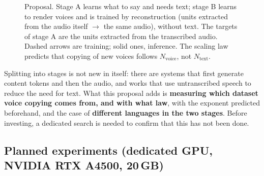\documentclass[a4paper,11pt]{article}
\begin{document}
\begin{figure}[H]
{}
\caption{Proposal. Stage A learns what to say and needs text; stage B learns to render voices and is trained by reconstruction (units extracted from the audio itself $\rightarrow$ the same audio), without text. The targets of stage A are the units extracted from the transcribed audio. Dashed arrows are training; solid ones, inference. The scaling law predicts that copying of new voices follows $N_{\text{voice}}$, not $N_{\text{text}}$.}
\label{fig:proposta}
\end{figure}

Splitting into stages is not new in itself: there are systems that first generate content tokens and then the audio, and works that use untranscribed speech to reduce the need for text. What this proposal adds is \textbf{measuring which dataset voice copying comes from, and with what law}, with the exponent predicted beforehand, and the case of \textbf{different languages in the two stages}. Before investing, a dedicated search is needed to confirm that this has not been done.

\subsection{Planned experiments (dedicated GPU, NVIDIA RTX A4500, 20\,GB)}
\end{document}
